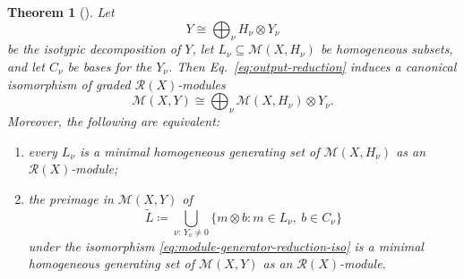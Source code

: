 \documentclass[11pt]{article}
\newcommand{\scM}{\mathcal{M}}
\newcommand{\scR}{\mathcal{R}}
\newtheorem{theorem}{Theorem}[section]
\theoremstyle{definition}
\begin{document}
\begin{theorem}[]\label{thm:module-generator-reduction}
  Let
  \[
    Y\cong \bigoplus_{\nu} H_\nu\otimes Y_\nu
  \]
  be the isotypic decomposition of $Y$, let $L_\nu \subseteq \scM(X,H_\nu)$ be homogeneous subsets, and let $C_\nu$ be bases for the $Y_\nu$. Then Eq.~\eqref{eq:output-reduction} induces a canonical isomorphism of graded $\scR(X)$-modules
  \begin{equation}\label{eq:module-generator-reduction-iso}
    \scM(X,Y)\cong\bigoplus_{\nu}\scM(X,H_\nu)\otimes Y_\nu.
  \end{equation}
  Moreover, the following are equivalent:
  \begin{enumerate}[label=\textup{(\roman*)}]
    \item every $L_\nu$ is a minimal homogeneous generating set of $\scM(X,H_\nu)$ as an $\scR(X)$-module;
    \item the preimage in $\scM(X,Y)$ of
    \[
      \widetilde L\coloneq \bigcup_{\nu:\,Y_\nu\neq 0}\{m\otimes b : m\in L_\nu,\ b\in C_\nu\}
    \]
    under the isomorphism \eqref{eq:module-generator-reduction-iso} is a minimal homogeneous generating set of $\scM(X,Y)$ as an $\scR(X)$-module.
  \end{enumerate}
\end{theorem}
\end{document}
